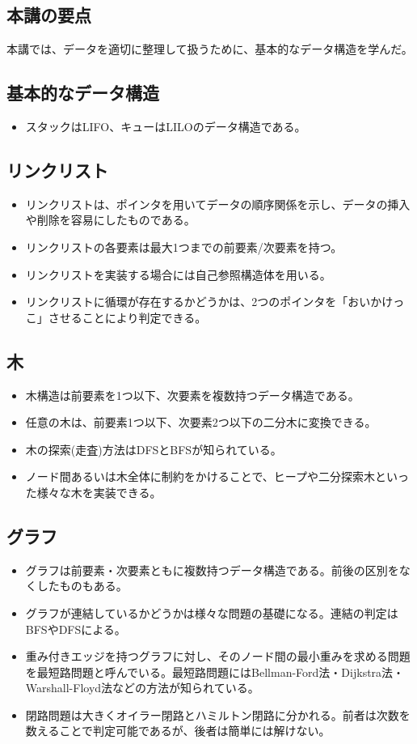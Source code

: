 \newpage
\begin{shadebox}
\section*{本講の要点}
本講では、データを適切に整理して扱うために、基本的なデータ構造を学んだ。
\subsection*{基本的なデータ構造}
\begin{itemize}
\item スタックはLIFO、キューはLILOのデータ構造である。
\end{itemize}

\subsection*{リンクリスト}
\begin{itemize}
\item リンクリストは、ポインタを用いてデータの順序関係を示し、データの挿入や削除を容易にしたものである。
\item リンクリストの各要素は最大1つまでの前要素/次要素を持つ。
\item リンクリストを実装する場合には自己参照構造体を用いる。
\item リンクリストに循環が存在するかどうかは、2つのポインタを「おいかけっこ」させることにより判定できる。
\end{itemize}

\subsection*{木}
\begin{itemize}
\item 木構造は前要素を1つ以下、次要素を複数持つデータ構造である。
\item 任意の木は、前要素1つ以下、次要素2つ以下の二分木に変換できる。
\item 木の探索(走査)方法はDFSとBFSが知られている。
\item ノード間あるいは木全体に制約をかけることで、ヒープや二分探索木といった様々な木を実装できる。
\end{itemize}

\subsection*{グラフ}
\begin{itemize}
\item グラフは前要素・次要素ともに複数持つデータ構造である。前後の区別をなくしたものもある。
\item グラフが連結しているかどうかは様々な問題の基礎になる。連結の判定はBFSやDFSによる。
\item 重み付きエッジを持つグラフに対し、そのノード間の最小重みを求める問題を最短路問題と呼んでいる。最短路問題にはBellman-Ford法・Dijkstra法・Warshall-Floyd法などの方法が知られている。
\item 閉路問題は大きくオイラー閉路とハミルトン閉路に分かれる。前者は次数を数えることで判定可能であるが、後者は簡単には解けない。
\end{itemize}

\end{shadebox}
